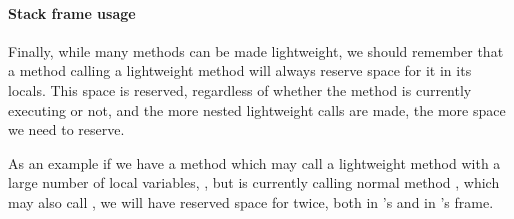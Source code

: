 \paragraph{Stack frame usage}
Finally, while many methods can be made lightweight, we should remember that a method calling a lightweight method will always reserve space for it in its locals. This space is reserved, regardless of whether the method is currently executing or not, and the more nested lightweight calls are made, the more space we need to reserve.

As an example if we have a method  which may call a lightweight method with a large number of local variables, , but is currently calling normal method , which may also call , we will have reserved space for  twice, both in 's and in 's frame.

